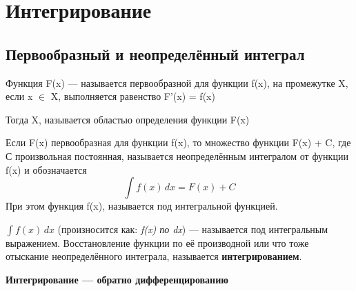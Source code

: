 \documentclass[a4paper]{article}
\begin{document}
	\section{Интегрирование}
	\subsection{Первообразный и неопределённый интеграл}
	
	Функция F(x) --- называется первообразной для функции f(x), на промежутке X, если x $\in$ X, выполняется равенство F'(x) = f(x)

	Тогда X, называется областью определения функции F(x)
	
	\vspace{\baselineskip}
	\begin{itshape}
		Если F(x) первообразная для функции f(x), то множество функции F(x) + C, где С произвольная постоянная, называется неопределённым интегралом от функции f(x) и обозначается 
		\begin{displaymath}
		\int f(x)\,dx=F(x)+C
		\end{displaymath}
		\vspace{\baselineskip}
		При этом функция f(x), называется под интегральной функцией.
	\end{itshape}
	
	\(\int f(x)\,dx\) (произносится как: \textit{f(x) по dx}) --- называется под интегральным выражением.
	Восстановление функции по её производной или что тоже отыскание неопределённого интеграла, называется \textbf{интегрированием}.
	
	\begin{center} \textbf{Интегрирование --- обратно дифференцированию}  \end{center}
	
\end{document}
